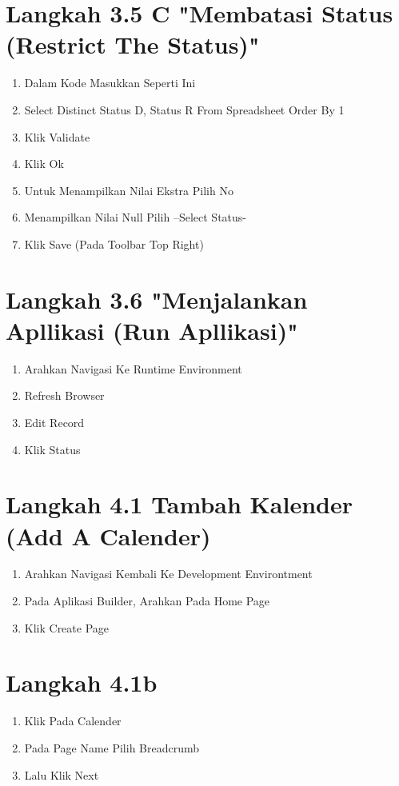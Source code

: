 \documentclass{article}
\begin{document}
\section{Langkah 3.5 C "Membatasi Status (Restrict The Status)"}
\begin{enumerate}
    \item Dalam Kode Masukkan Seperti Ini
    \item Select Distinct Status D, Status R From Spreadsheet Order By 1
    \item Klik Validate
    \item Klik Ok
    \item Untuk Menampilkan Nilai Ekstra Pilih No
    \item Menampilkan Nilai Null Pilih –Select Status-
    \item Klik Save (Pada Toolbar Top Right)
 
\end{enumerate}
\section{Langkah 3.6 "Menjalankan Apllikasi (Run Apllikasi)"}
\begin{enumerate}
    \item Arahkan Navigasi Ke Runtime Environment
    \item Refresh Browser
    \item Edit Record
    \item Klik Status

\end{enumerate}
\section{Langkah 4.1 Tambah Kalender (Add A Calender)}
\begin{enumerate}
    \item Arahkan Navigasi Kembali Ke Development Environtment
    \item Pada Aplikasi Builder, Arahkan Pada Home Page
    \item Klik Create Page

\end{enumerate}
\section{Langkah 4.1b}
\begin{enumerate}
    \item Klik Pada Calender
    \item Pada Page Name Pilih Breadcrumb
    \item Lalu Klik Next

\end{enumerate}
\end{document}
